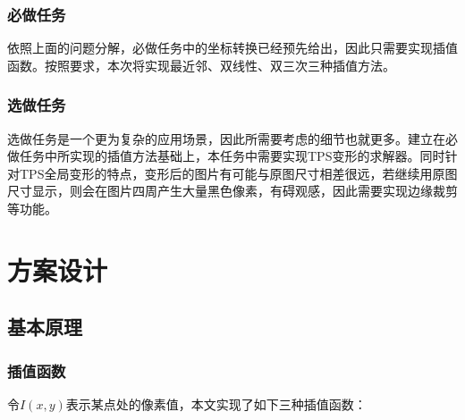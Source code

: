 \documentclass[UTF8]{ctexart}
\begin{document}
\subsubsection{必做任务}
依照上面的问题分解，必做任务中的坐标转换已经预先给出，因此只需要实现插值函数。按照要求，本次将实现最近邻、双线性、双三次三种插值方法。

\subsubsection{选做任务}
选做任务是一个更为复杂的应用场景，因此所需要考虑的细节也就更多。建立在必做任务中所实现的插值方法基础上，本任务中需要实现TPS变形的求解器。同时针对TPS全局变形的特点，变形后的图片有可能与原图尺寸相差很远，若继续用原图尺寸显示，则会在图片四周产生大量黑色像素，有碍观感，因此需要实现边缘裁剪等功能。

\section{方案设计}

\subsection{基本原理}

\subsubsection{插值函数}
令$I(x,y)$表示某点处的像素值，本文实现了如下三种插值函数：
\end{document}

